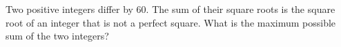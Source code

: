Two positive integers differ by $60.$ The sum of their square roots is the square root of an integer that is not a perfect square. What is the maximum possible sum of the two integers?